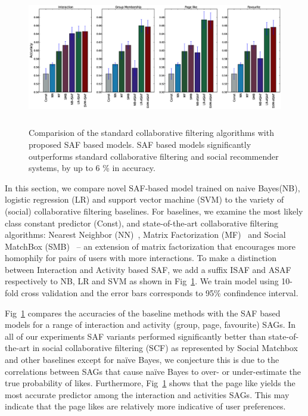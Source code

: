 \begin{figure}[tbp!]
\hspace{-6mm}\includegraphics[width=180mm,height=60mm]{data/plots/accuracy/accuracyLargeNew.eps}
\caption{  Comparision of the standard collaborative filtering algorithms with proposed SAF based models.  SAF based models significantly outperforms standard collaborative filtering and social recommender systems, by up to 6 \% in accuracy. }
\label{Fig1}
\end{figure}

In this section, we compare novel SAF-based model trained on naive Bayes(NB), 
logistic regression (LR) and support vector machine (SVM) to the variety of
(social) collaborative filtering baselines. For baselines, we examine the most 
likely class constant predictor (Const), and state-of-the-art collaborative 
filtering algorithms: Nearest Neighbor (NN)~\cite{bellkor}, Matrix Factorization (MF)~\cite{pmf} 
and Social MatchBox (SMB)~\cite{Noel2012NOF} -- an extension of matrix
factorization that encourages more homophily for pairs of users with
more interactions. To make a distinction between Interaction and Activity based SAF, 
we add a suffix ISAF and ASAF respectively to NB, LR and SVM as shown in Fig~\ref{Fig1}. We train model using
10-fold cross validation and the error bars corresponds to 95\% confindence interval.

Fig~\ref{Fig1} compares the accuracies of the baseline methods 
with the SAF based models for a range of interaction and activity (group,
page, favourite) SAGs.  In all of our experiments SAF variants
performed significantly better than state-of-the-art in social
collaborative filtering (SCF) as represented by Social
Matchbox~\cite{Noel2012NOF} and other baselines except for na\"{i}ve Bayes, 
we conjecture this is due to the correlations between SAGs that cause na\"{i}ve
Bayes to over- or under-estimate the true probability of likes. Furthermore, Fig~\ref{Fig1} 
shows that the page like yields the most accurate predictor among the interaction and activities SAGs.
This may indicate that the page likes are relatively more indicative of user preferences.

